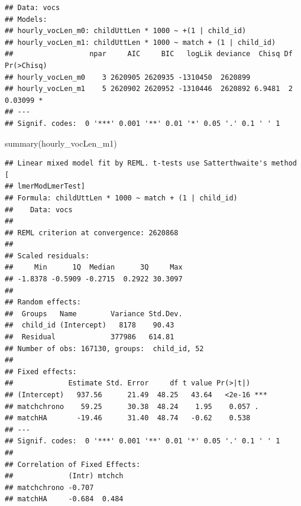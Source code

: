 \documentclass[
]{article}
\newenvironment{Shaded}{\begin{snugshade}}{\end{snugshade}}
\newcommand{\FunctionTok}[1]{\textcolor[rgb]{0.00,0.00,0.00}{#1}}
\newcommand{\NormalTok}[1]{#1}
\begin{document}
\begin{verbatim}
## Data: vocs
## Models:
## hourly_vocLen_m0: childUttLen * 1000 ~ +(1 | child_id)
## hourly_vocLen_m1: childUttLen * 1000 ~ match + (1 | child_id)
##                  npar     AIC     BIC   logLik deviance  Chisq Df Pr(>Chisq)  
## hourly_vocLen_m0    3 2620905 2620935 -1310450  2620899                       
## hourly_vocLen_m1    5 2620902 2620952 -1310446  2620892 6.9481  2    0.03099 *
## ---
## Signif. codes:  0 '***' 0.001 '**' 0.01 '*' 0.05 '.' 0.1 ' ' 1
\end{verbatim}

\begin{Shaded}
\begin{Highlighting}[]
\FunctionTok{summary}\NormalTok{(hourly\_vocLen\_m1)}
\end{Highlighting}
\end{Shaded}

\begin{verbatim}
## Linear mixed model fit by REML. t-tests use Satterthwaite's method [
## lmerModLmerTest]
## Formula: childUttLen * 1000 ~ match + (1 | child_id)
##    Data: vocs
## 
## REML criterion at convergence: 2620868
## 
## Scaled residuals: 
##     Min      1Q  Median      3Q     Max 
## -1.8378 -0.5909 -0.2715  0.2922 30.3097 
## 
## Random effects:
##  Groups   Name        Variance Std.Dev.
##  child_id (Intercept)   8178    90.43  
##  Residual             377986   614.81  
## Number of obs: 167130, groups:  child_id, 52
## 
## Fixed effects:
##             Estimate Std. Error     df t value Pr(>|t|)    
## (Intercept)   937.56      21.49  48.25   43.64   <2e-16 ***
## matchchrono    59.25      30.38  48.24    1.95    0.057 .  
## matchHA       -19.46      31.40  48.74   -0.62    0.538    
## ---
## Signif. codes:  0 '***' 0.001 '**' 0.01 '*' 0.05 '.' 0.1 ' ' 1
## 
## Correlation of Fixed Effects:
##             (Intr) mtchch
## matchchrono -0.707       
## matchHA     -0.684  0.484
\end{verbatim}
\end{document}
